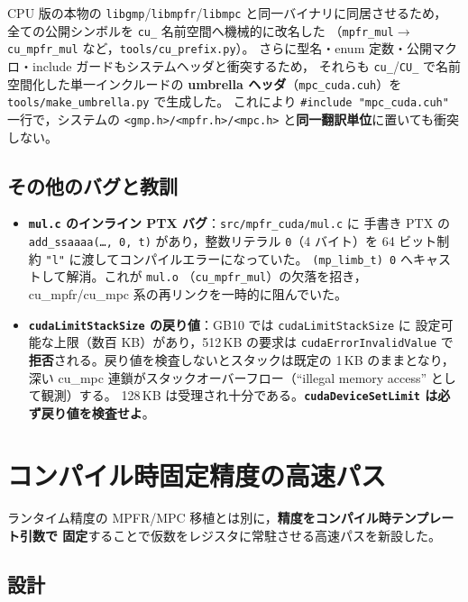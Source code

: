 \documentclass[uplatex,dvipdfmx,a4paper,11pt]{jsarticle}
\newcommand{\code}[1]{\texttt{#1}}
\begin{document}
CPU 版の本物の \code{libgmp}/\code{libmpfr}/\code{libmpc} と同一バイナリに同居させるため，
全ての公開シンボルを \code{cu\_} 名前空間へ機械的に改名した
（\code{mpfr\_mul}$\to$\code{cu\_mpfr\_mul} など，\code{tools/cu\_prefix.py}）。
さらに型名・enum 定数・公開マクロ・include ガードもシステムヘッダと衝突するため，
それらも \code{cu\_}/\code{CU\_} で名前空間化した単一インクルードの
\textbf{umbrella ヘッダ}（\code{mpc\_cuda.cuh}）を \code{tools/make\_umbrella.py} で生成した。
これにより \code{\#include "mpc\_cuda.cuh"} 一行で，システムの
\code{<gmp.h>/<mpfr.h>/<mpc.h>} と\textbf{同一翻訳単位}に置いても衝突しない。

\subsection{その他のバグと教訓}

\begin{itemize}
\item \textbf{\code{mul.c} のインライン PTX バグ}：\code{src/mpfr\_cuda/mul.c} に
      手書き PTX の \code{add\_ssaaaa(\dots, 0, t)} があり，整数リテラル \code{0}（4 バイト）を
      64 ビット制約 \code{"l"} に渡してコンパイルエラーになっていた。
      \code{(mp\_limb\_t)\,0} へキャストして解消。これが \code{mul.o}
      （\code{cu\_mpfr\_mul}）の欠落を招き，cu\_mpfr/cu\_mpc 系の再リンクを一時的に阻んでいた。
\item \textbf{\code{cudaLimitStackSize} の戻り値}：GB10 では \code{cudaLimitStackSize} に
      設定可能な上限（数百 KB）があり，512\,KB の要求は \code{cudaErrorInvalidValue} で
      \textbf{拒否}される。戻り値を検査しないとスタックは既定の 1\,KB のままとなり，
      深い cu\_mpc 連鎖がスタックオーバーフロー（``illegal memory access'' として観測）する。
      128\,KB は受理され十分である。\textbf{\code{cudaDeviceSetLimit} は必ず戻り値を検査せよ}。
\end{itemize}

\section{コンパイル時固定精度の高速パス}
\label{sec:fixed}

ランタイム精度の MPFR/MPC 移植とは別に，\textbf{精度をコンパイル時テンプレート引数で
固定}することで仮数をレジスタに常駐させる高速パスを新設した。

\subsection{設計}
\end{document}
